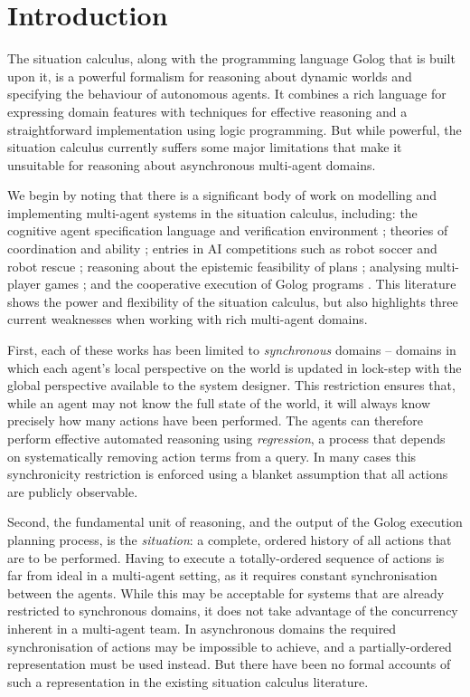 

\chapter{Introduction}

\label{ch:intro}

The situation calculus, along with the programming language Golog
that is built upon it, is a powerful formalism for reasoning about
dynamic worlds and specifying the behaviour of autonomous agents.
It combines a rich language for expressing domain features with techniques
for effective reasoning and a straightforward implementation using
logic programming. But while powerful, the situation calculus currently
suffers some major limitations that make it unsuitable for reasoning
about asynchronous multi-agent domains.

We begin by noting that there is a significant body of work on modelling
and implementing multi-agent systems in the situation calculus, including:
the cognitive agent specification language and verification environment
\citep{shapiro02casl}; theories of coordination and ability \citep{ghaderi07sc_joint_ability};
entries in AI competitions such as robot soccer \citep{Ferrein2005readylog}
and robot rescue \citep{farinelli07team_golog}; reasoning about the
epistemic feasibility of plans \citep{Lesperance01epi_feas_casl};
analysing multi-player games \citep{delgrande01sitcalc_cleudo}; and
the cooperative execution of Golog programs \citep{Ferrein2005readylog,kelly06hlp_dps}.
This literature shows the power and flexibility of the situation calculus,
but also highlights three current weaknesses when working with rich
multi-agent domains.

First, each of these works has been limited to \emph{synchronous}
domains -- domains in which each agent's local perspective on the
world is updated in lock-step with the global perspective available
to the system designer. This restriction ensures that, while an agent
may not know the full state of the world, it will always know precisely
how many actions have been performed. The agents can therefore perform
effective automated reasoning using \emph{regression}, a process that
depends on systematically removing action terms from a query. In many
cases this synchronicity restriction is enforced using a blanket assumption
that all actions are publicly observable.

Second, the fundamental unit of reasoning, and the output of the Golog
execution planning process, is the \emph{situation}: a complete, ordered
history of all actions that are to be performed. Having to execute
a totally-ordered sequence of actions is far from ideal in a multi-agent
setting, as it requires constant synchronisation between the agents.
While this may be acceptable for systems that are already restricted
to synchronous domains, it does not take advantage of the concurrency
inherent in a multi-agent team. In asynchronous domains the required
synchronisation of actions may be impossible to achieve, and a partially-ordered
representation must be used instead. But there have been no formal
accounts of such a representation in the existing situation calculus
literature.

